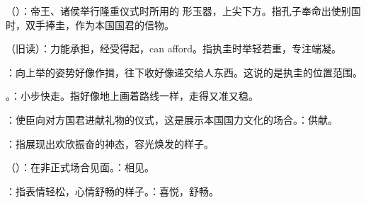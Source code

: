 {
\item {}（）：帝王、诸侯举行隆重仪式时所用的  形玉器，上尖下方。指孔子奉命出使别国时，双手捧圭，作为本国国君的信物。
\item {}（旧读）：力能承担，经受得起，can afford。指执圭时举轻若重，专注端凝。
\item {}：向上举的姿势好像作揖，往下收好像递交给人东西。这说的是执圭的位置范围。
\item {}。：小步快走。指好像地上画着路线一样，走得又准又稳。
\item {}：使臣向对方国君进献礼物的仪式，这是展示本国国力文化的场合。：供献。
\item {}：指展现出欢欣振奋的神态，容光焕发的样子。
\item {}（）：在非正式场合见面。：相见。
\item {}：指表情轻松，心情舒畅的样子。：喜悦，舒畅。
}
{}


